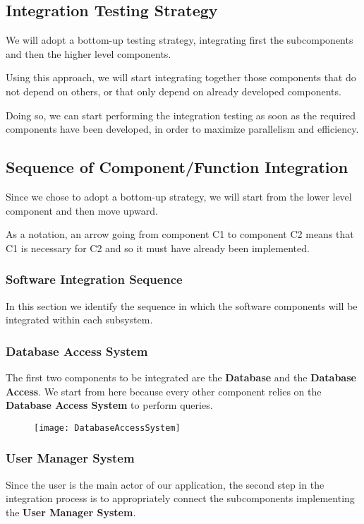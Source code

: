 \subsection{Integration Testing Strategy}
We will adopt a bottom-up testing strategy, integrating first the subcomponents and then the higher level components. 

Using this approach, we will start integrating together those components that do not depend on others, or that only depend on already developed components.  

Doing so, we can start performing the integration testing as soon as the required components have been developed, in order to maximize parallelism and efficiency.

\subsection{Sequence of Component/Function Integration} 
Since we chose to adopt a bottom-up strategy, we will start from the lower level component and then move upward. 

As a notation, an arrow going from component C1 to component C2 means that C1 is necessary for C2 and so it must have already been implemented.

\subsubsection{Software  Integration  Sequence}
In this section we identify the sequence in which the software components will be integrated within each  subsystem.

\subsubsection*{Database Access System}
The first two components to be integrated are the \textbf{Database} and the \textbf{Database Access}. We start from here because every other component relies on the \textbf{Database Access System} to perform queries.

\begin{figure}[H]
	\centering
	\texttt{[image: DatabaseAccessSystem]}
\end{figure}
\newpage
\subsubsection*{User Manager System}
Since the user is the main actor of our application, the second step in the integration process is to appropriately connect the subcomponents implementing the \textbf{User Manager System}. 

